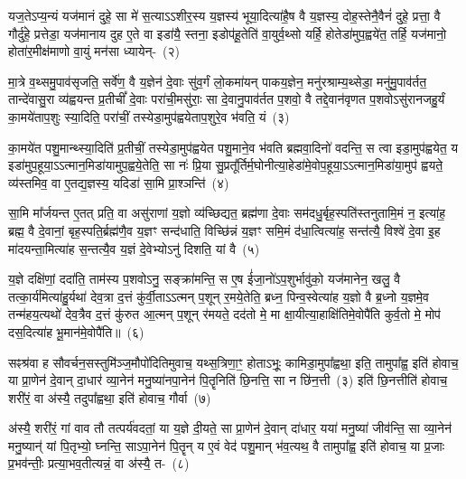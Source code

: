 यज॒ते\-ऽप्य॒न्यं यज॑मानं दुहे॒ सा मे॑ स॒त्या\-ऽऽ\-शीर॒स्य य॒ज्ञस्य॑ भूया॒दित्या॑है॒ष वै य॒ज्ञस्य॒ दोह॒स्तेनै॒वैनं॑ दुहे॒ प्रत्ता॒ वै गौर्दु॑हे॒ प्रत्तेडा॒ यज॑मानाय दुह ए॒ते वा इडा॑यै॒ स्तना॒ इडोप॑हू॒तेति॑ वा॒युर्व॒थ्सो यर्\mbox{}हि॒ होतेडा॑मुप॒ह्वये॑त॒ तर्\mbox{}हि॒ यज॑मानो॒ होता॑र॒मीक्ष॑माणो वा॒युं मन॑सा ध्यायेन्-~(२)

मा॒त्रे व॒थ्समु॒पाव॑सृजति॒ सर्वे॑ण॒ वै य॒ज्ञेन॑ दे॒वाः सु॑व॒र्गं लो॒कमा॑यन् पाकय॒ज्ञेन॒ मनु॑रश्राम्य॒थ्सेडा॒ मनु॑मु॒पाव॑र्तत॒ तान्दे॑वासु॒रा व्य॑ह्वयन्त प्र॒तीचीं᳚ दे॒वाः परा॑ची॒मसु॑राः॒ सा दे॒वानु॒पाव॑र्तत प॒शवो॒ वै तद्दे॒वान॑वृणत प॒शवो\-ऽसु॑रानजहु॒र्यं का॒मये॑ताप॒शुः स्या॒दिति॒ परा॑चीं॒ तस्येडा॒मुप॑ह्वयेताप॒शुरे॒व भ॑वति॒ यं~(३)

का॒मये॑त पशु॒मान्थ्स्या॒दिति॑ प्र॒तीचीं॒ तस्येडा॒मुप॑ह्वयेत पशु॒माने॒व भ॑वति ब्रह्मवा॒दिनो॑ वदन्ति॒ स त्वा इडा॒मुप॑ह्वयेत॒ य इडा॑मुप॒हूया॒\-ऽऽ\-त्मान॒मिडा॑यामुप॒ह्वये॒तेति॒ सा नः॑ प्रि॒या सु॒प्रतू᳚र्तिर्म॒घोनीत्या॒हेडा॑मे॒वोप॒हूया॒\-ऽऽ\-त्मान॒मिडा॑या॒मुप॑ ह्वयते॒ व्य॑स्तमिव॒ वा ए॒तद्य॒ज्ञस्य॒ यदिडा॑ सा॒मि प्रा॒श्ञन्ति॑~(४)

सा॒मि मा᳚र्जयन्त ए॒तत् प्रति॒ वा असु॑राणां य॒ज्ञो व्य॑च्छिद्यत॒ ब्रह्म॑णा दे॒वाः सम॑दधु॒र्बृह॒स्पति॑स्तनुतामि॒मं न॒ इत्या॑ह॒ ब्रह्म॒ वै दे॒वानां॒ बृह॒स्पति॒र्ब्रह्म॑णै॒व य॒ज्ञꣳ सन्द॑धाति॒ विच्छि॑न्नं य॒ज्ञꣳ समि॒मं द॑धा॒त्वित्या॑ह॒ सन्त॑त्यै॒ विश्वे॑ दे॒वा इ॒ह मा॑दयन्ता॒मित्या॑ह स॒न्तत्यै॒व य॒ज्ञं दे॒वेभ्यो\-ऽनु॑ दिशति॒ यां वै~(५)


य॒ज्ञे दक्षि॑णां॒ ददा॑ति॒ ताम॑स्य प॒शवो\-ऽनु॒ सङ्क्रा॑मन्ति॒ स ए॒ष ई॑जा॒नो॑\-ऽप॒शुर्भावु॑को॒ यज॑मानेन॒ खलु॒ वै तत्का॒र्य॑मित्या॑हु॒र्यथा॑ देव॒त्रा द॒त्तं कु॑र्वी॒ता\-ऽऽ\-त्मन् प॒शून् र॒मये॒तेति॒ ब्रध्न॒ पिन्व॒स्वेत्या॑ह य॒ज्ञो वै ब्र॒ध्नो य॒ज्ञमे॒व तन्म॑हय॒त्यथो॑ देव॒त्रैव द॒त्तं कु॑रुत आ॒त्मन् प॒शून् र॑मयते॒ दद॑तो मे॒ मा क्षा॒यीत्या॒हाक्षि॑तिमे॒वोपै॑ति कुर्व॒तो मे॒ मोप॑ दस॒दित्या॑ह भू॒मान॑मे॒वोपै॑ति॥~(६)

{\anuvakamend[{वि॒द्वान्ध्या॑ये॒ द्यं प्रा॒श्ञन्ति॒ यां वै म॒ एका॒न्नविꣳ॑श॒तिश्च॑}]}%

सꣴश्र॑वा ह सौवर्चन॒सस्तुमि॑ञ्ज॒मौपो॑दितिमुवाच॒ यथ्स॒त्रिणा॒ꣳ॒ होता\-ऽभूः॒ कामिडा॒मुपा᳚ह्वथा॒ इति॒ तामुपा᳚ह्व॒ इति॑ होवाच॒ या प्रा॒णेन॑ दे॒वान् दा॒धार॑ व्या॒नेन॑ मनु॒ष्या॑नपा॒नेन॑ पि॒तॄनिति॑ छि॒नत्ति॒ सा न छि॑न॒त्ती~(३) इति॑ छि॒नत्तीति॑ होवाच॒ शरी॑रं॒ वा अ॑स्यै॒ तदुपा᳚ह्वथा॒ इति॑ होवाच॒ गौर्वा~(७)

अ॑स्यै॒ शरी॑रं॒ गां वाव तौ तत्पर्य॑वदतां॒ या य॒ज्ञे दी॒यते॒ सा प्रा॒णेन॑ दे॒वान् दा॑धार॒ यया॑ मनु॒ष्या॑ जीव॑न्ति॒ सा व्या॒नेन॑ मनु॒ष्यान्॑ यां पि॒तृभ्यो॒ घ्नन्ति॒ सा\-ऽपा॒नेन॑ पि॒तॄन् य ए॒वं वेद॑ पशु॒मान् भ॑व॒त्यथ॒ वै तामुपा᳚ह्व॒ इति॑ होवाच॒ या प्र॒जाः प्र॒भव॑न्तीः॒ प्रत्या॒भव॒तीत्यन्नं॒ वा अ॑स्यै॒ त-~(८)


